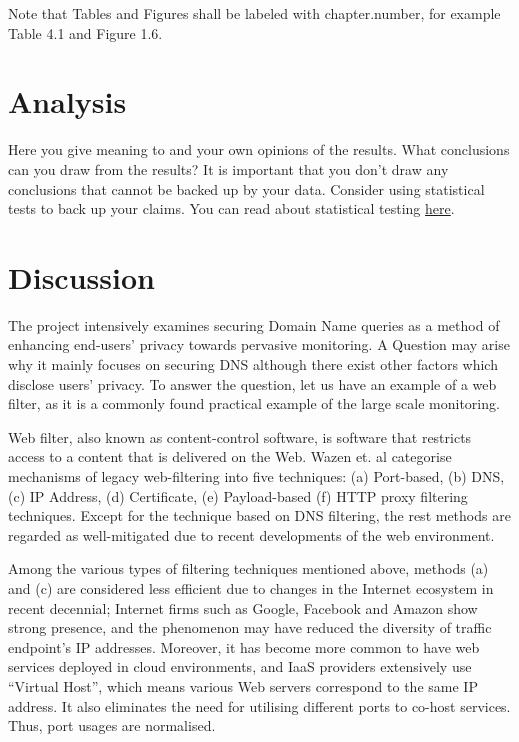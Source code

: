 \documentclass[a4paper,12pt]{article}
\begin{document}
Note that Tables and Figures shall be labeled with chapter.number, for example Table 4.1 and Figure 1.6.

\newpage
	
\section{Analysis}
Here you give meaning to and your own opinions of the results. What conclusions can you draw from the results? It is important that you don't draw any conclusions that cannot be backed up by your data. Consider using statistical tests to back up your claims. You can read about statistical testing \href{https://coursepress.lnu.se/subject/thesis-projects/statistical-testing/}{here}. 
	
\newpage
	
\section{Discussion}
The project intensively examines securing Domain Name queries as a method of enhancing end-users' privacy towards pervasive monitoring.
A Question may arise why it mainly focuses on securing DNS although there exist other factors which disclose users' privacy.
To answer the question, let us have an example of a web filter, as it is a commonly found practical example of the large scale monitoring\cite{murdoch2008tools}.

Web filter, also known as content-control software, is software that restricts access to a content that is delivered on the Web.
Wazen et. al categorise mechanisms of legacy web-filtering into five techniques: (a) Port-based, (b) DNS, (c) IP Address, (d) Certificate, (e) Payload-based (f) HTTP proxy filtering techniques\cite{shbair2015efficiently}.
Except for the technique based on DNS filtering, the rest methods are regarded as well-mitigated due to recent developments of the web environment. 

Among the various types of filtering techniques mentioned above, methods (a) and (c) are considered less efficient due to changes in the Internet ecosystem in recent decennial;
Internet firms such as Google, Facebook and Amazon show strong presence\cite{haucap2014google}, and the phenomenon may have reduced the diversity of traffic endpoint's IP addresses.
Moreover, it has become more common to have web services deployed in cloud environments\cite{clouds2018stat}, and IaaS providers extensively use ``Virtual Host\cite{virtual24host}'', which means various Web servers correspond to the same IP address.
It also eliminates the need for utilising different ports to co-host services. Thus, port usages are normalised.
\end{document}
